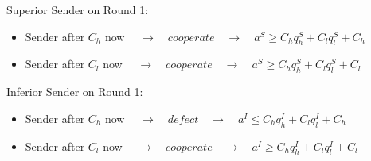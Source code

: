 \documentclass[11pt]{article}
\theoremstyle{plainCl1}
\begin{document}
Superior Sender on Round 1:
\begin{itemize} [noitemsep]
	\item Sender after $C_h$ now $\quad \rightarrow \quad cooperate \quad \rightarrow \quad a^S \geq C_h q^S_h + C_l q^S_l + C_h$\\
	\item Sender after $C_l$ now $\quad \rightarrow \quad cooperate \quad \rightarrow \quad a^S \geq C_h q^S_h + C_l q^S_l + C_l$\\
\end{itemize}
Inferior Sender on Round 1:
\begin{itemize} [noitemsep]
	\item Sender after $C_h$ now $\quad \rightarrow \quad defect \quad \rightarrow \quad a^I \leq C_h q^I_h + C_l q^I_l + C_h$\\
	\item Sender after $C_l$ now $\quad \rightarrow \quad cooperate \quad \rightarrow \quad a^I \geq C_h q^I_h + C_l q^I_l + C_l$\\
\end{itemize}

	
\end{document}
